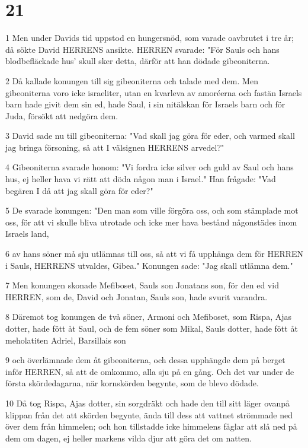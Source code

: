 \chapter{21}

\par 1 Men under Davids tid uppstod en hungersnöd, som varade oavbrutet i tre år; då sökte David HERRENS ansikte. HERREN svarade: "För Sauls och hans blodbefläckade hus' skull sker detta, därför att han dödade gibeoniterna.
\par 2 Då kallade konungen till sig gibeoniterna och talade med dem. Men gibeoniterna voro icke israeliter, utan en kvarleva av amoréerna och fastän Israels barn hade givit dem sin ed, hade Saul, i sin nitälskan för Israels barn och för Juda, försökt att nedgöra dem.
\par 3 David sade nu till gibeoniterna: "Vad skall jag göra för eder, och varmed skall jag bringa försoning, så att I välsignen HERRENS arvedel?"
\par 4 Gibeoniterna svarade honom: "Vi fordra icke silver och guld av Saul och hans hus, ej heller hava vi rätt att döda någon man i Israel." Han frågade: "Vad begären I då att jag skall göra för eder?"
\par 5 De svarade konungen: "Den man som ville förgöra oss, och som stämplade mot oss, för att vi skulle bliva utrotade och icke mer hava bestånd någonstädes inom Israels land,
\par 6 av hans söner må sju utlämnas till oss, så att vi få upphänga dem för HERREN i Sauls, HERRENS utvaldes, Gibea." Konungen sade: "Jag skall utlämna dem."
\par 7 Men konungen skonade Mefiboset, Sauls son Jonatans son, för den ed vid HERREN, som de, David och Jonatan, Sauls son, hade svurit varandra.
\par 8 Däremot tog konungen de två söner, Armoni och Mefiboset, som Rispa, Ajas dotter, hade fött åt Saul, och de fem söner som Mikal, Sauls dotter, hade fött åt meholatiten Adriel, Barsillais son
\par 9 och överlämnade dem åt gibeoniterna, och dessa upphängde dem på berget inför HERREN, så att de omkommo, alla sju på en gång. Och det var under de första skördedagarna, när kornskörden begynte, som de blevo dödade.
\par 10 Då tog Rispa, Ajas dotter, sin sorgdräkt och hade den till sitt läger ovanpå klippan från det att skörden begynte, ända till dess att vattnet strömmade ned över dem från himmelen; och hon tillstadde icke himmelens fåglar att slå ned på dem om dagen, ej heller markens vilda djur att göra det om natten.
